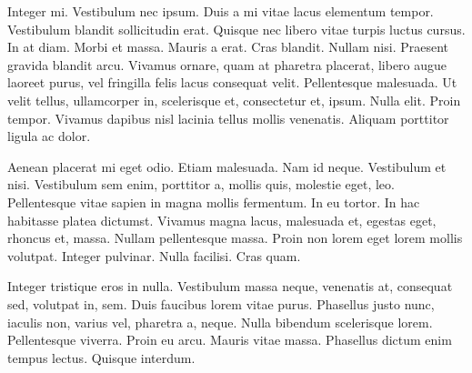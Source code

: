 Integer mi. Vestibulum nec ipsum. Duis a mi vitae lacus elementum tempor. Vestibulum blandit sollicitudin erat. Quisque nec libero vitae turpis luctus cursus. In at diam. Morbi et massa. Mauris a erat. Cras blandit. Nullam nisi. Praesent gravida blandit arcu. Vivamus ornare, quam at pharetra placerat, libero augue laoreet purus, vel fringilla felis lacus consequat velit. Pellentesque malesuada. Ut velit tellus, ullamcorper in, scelerisque et, consectetur et, ipsum. Nulla elit. Proin tempor. Vivamus dapibus nisl lacinia tellus mollis venenatis. Aliquam porttitor ligula ac dolor.

Aenean placerat mi eget odio. Etiam malesuada. Nam id neque. Vestibulum et nisi. Vestibulum sem enim, porttitor a, mollis quis, molestie eget, leo. Pellentesque vitae sapien in magna mollis fermentum. In eu tortor. In hac habitasse platea dictumst. Vivamus magna lacus, malesuada et, egestas eget, rhoncus et, massa. Nullam pellentesque massa. Proin non lorem eget lorem mollis volutpat. Integer pulvinar. Nulla facilisi. Cras quam.

Integer tristique eros in nulla. Vestibulum massa neque, venenatis at, consequat sed, volutpat in, 
sem. Duis faucibus lorem vitae purus. Phasellus justo nunc, iaculis non, varius vel, pharetra a, 
neque. Nulla bibendum scelerisque lorem. Pellentesque viverra. Proin eu arcu. Mauris vitae massa. 
Phasellus dictum enim tempus lectus. Quisque interdum. 	